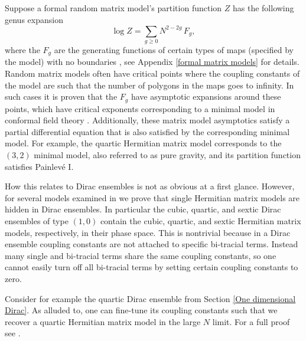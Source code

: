 \documentclass[10pt]{article}
\begin{document}
Suppose a formal random matrix model's partition function $Z$ has the following genus expansion
\begin{equation*}
 	\log Z = \sum_{g \geq 0} N^{2-2g} \,F_{g},
\end{equation*}
where the $F_{g}$ are the generating functions of certain types of maps (specified by the model) with no boundaries \cite{Eynard2018}, see Appendix \ref{formal matrix models} for details. Random matrix models often have critical points where the coupling constants of the model are such that the number of polygons in the maps goes to infinity. In such cases it is proven that the $F_{g}$ have asymptotic expansions around these points, which have critical exponents corresponding to a minimal model in conformal field theory \cite{Ds multi 2, Eynard LQG}. Additionally, these matrix model asymptotics satisfy a partial differential equation that is also satisfied by the corresponding minimal model. For example, the quartic Hermitian matrix model corresponds to the $(3,2)$ minimal model, also referred to as pure gravity, and its partition function satisfies Painlev\'e I.
 
How  this relates to Dirac ensembles is not as obvious at a first glance.  However, for several models examined in \cite{HKP 2} we prove that single Hermitian matrix models are hidden in Dirac ensembles. In particular the cubic, quartic, and sextic Dirac ensembles of type $(1,0)$ contain the cubic, quartic, and sextic Hermitian matrix models, respectively, in their phase space. This is nontrivial because in a Dirac ensemble coupling constants are not attached to specific bi-tracial terms. Instead many single and bi-tracial terms share the same coupling constants,  so one cannot easily turn off all bi-tracial terms by setting certain coupling constants to zero.

Consider for example the quartic Dirac ensemble from Section \ref{One dimensional Dirac}. As alluded to, one can fine-tune its coupling constants such that we recover a quartic Hermitian matrix model in the large $N$ limit. For a full proof see \cite{HKP 2}. 
\end{document}
